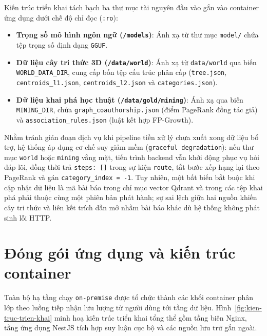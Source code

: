 Kiến trúc triển khai tách bạch ba thư mục tài nguyên đầu vào gắn vào container ứng dụng dưới chế độ chỉ đọc (\texttt{:ro}):
\begin{itemize}[label=--]
    \item \textbf{Trọng số mô hình ngôn ngữ (\texttt{/models})}: Ánh xạ từ thư mục \texttt{model/\allowbreak{}} chứa tệp trọng số định dạng \texttt{GGUF}.
    \item \textbf{Dữ liệu cây tri thức 3D (\texttt{/\allowbreak{}data/\allowbreak{}world})}: Ánh xạ từ \texttt{data/\allowbreak{}world} qua biến \texttt{WORLD\_\allowbreak{}DATA\_\allowbreak{}DIR}, cung cấp bốn tệp cấu trúc phân cấp (\texttt{tree.\allowbreak{}json}, \texttt{centroids\_\allowbreak{}l1.\allowbreak{}json}, \texttt{centroids\_\allowbreak{}l2.\allowbreak{}json} và \texttt{categories.\allowbreak{}json}).
    \item \textbf{Dữ liệu khai phá học thuật (\texttt{/\allowbreak{}data/\allowbreak{}gold/\allowbreak{}mining})}: Ánh xạ qua biến \texttt{MINING\_\allowbreak{}DIR}, chứa \texttt{graph\_\allowbreak{}coauthorship.\allowbreak{}json} (điểm PageRank đồng tác giả) và \texttt{association\_\allowbreak{}rules.\allowbreak{}json} (luật kết hợp FP-Growth).
\end{itemize}

Nhằm tránh gián đoạn dịch vụ khi pipeline tiền xử lý chưa xuất xong dữ liệu bổ trợ, hệ thống áp dụng cơ chế suy giảm mềm (\texttt{graceful degradation}): nếu thư mục \texttt{world} hoặc \texttt{mining} vắng mặt, tiến trình backend vẫn khởi động phục vụ hỏi đáp lõi, đồng thời trả \texttt{steps:\allowbreak{} []} trong sự kiện \texttt{route}, tắt bước xếp hạng lại theo PageRank và gán \texttt{category\_\allowbreak{}index = -1}. Tuy nhiên, một bất biến bắt buộc khi cập nhật dữ liệu là mã bài báo trong chỉ mục vector Qdrant và trong các tệp khai phá phải thuộc cùng một phiên bản phát hành; sự sai lệch giữa hai nguồn khiến cây tri thức và liên kết trích dẫn mở nhầm bài báo khác dù hệ thống không phát sinh lỗi HTTP.

\section{Đóng gói ứng dụng và kiến trúc container}
\label{sec:dong-goi-ung-dung}

Toàn bộ hạ tầng chạy \texttt{on-premise} được tổ chức thành các khối container phân lớp theo luồng tiếp nhận lưu lượng từ người dùng tới tầng dữ liệu. Hình~\ref{fig:kien-truc-trien-khai} minh hoạ kiến trúc triển khai tổng thể gồm tầng biên Nginx, tầng ứng dụng NestJS tích hợp suy luận cục bộ và các nguồn lưu trữ gắn ngoài.

